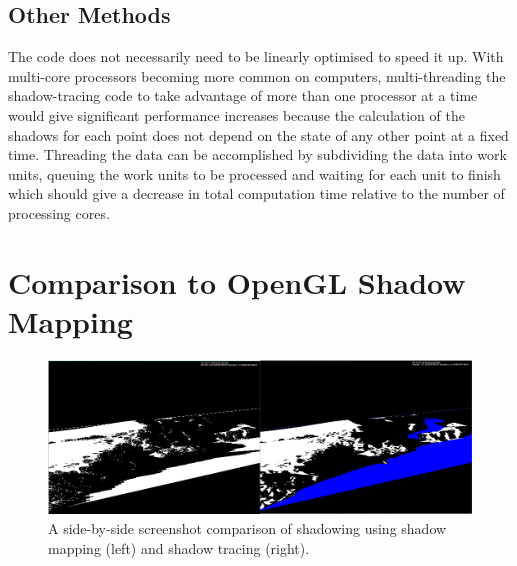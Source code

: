 \documentclass[12pt]{report}
\begin{document}
\subsection{Other Methods}
The code does not necessarily need to be linearly optimised to speed it up. With multi-core processors becoming more common on computers, multi-threading the shadow-tracing code to take advantage of more than one processor at a time would give significant performance increases because the calculation of the shadows for each point does not depend on the state of any other point at a fixed time. Threading the data can be accomplished by subdividing the data into work units, queuing the work units to be processed and waiting for each unit to finish which should give a decrease in total computation time relative to the number of processing cores.

\section{Comparison to OpenGL Shadow Mapping}
\begin{figure}[h]
\centering
\includegraphics[width=\textwidth]{aggregatorvsshadowmapping.png}
\caption{A side-by-side screenshot comparison of shadowing using shadow mapping (left) and shadow tracing (right).}
\label{image:aggregatorvsshadowmapping}
\end{figure}
\end{document}
